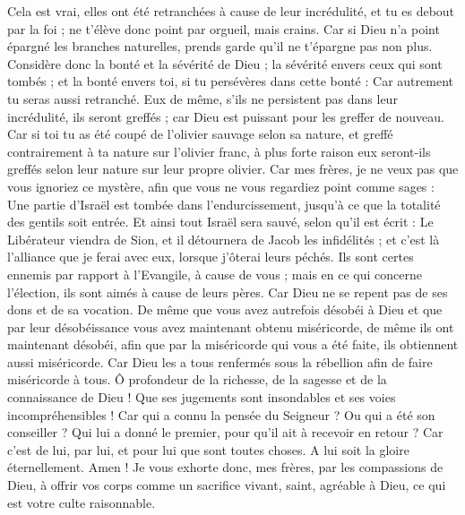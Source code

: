 \begin{multicols}{2}
Cela est vrai, elles ont été retranchées à cause de leur incrédulité, et tu es debout par la foi ; ne t'élève donc point par orgueil, mais crains.
Car si Dieu n'a point épargné les branches naturelles, prends garde qu'il ne t'épargne pas non plus.
Considère donc la bonté et la sévérité de Dieu ; la sévérité envers ceux qui sont tombés ; et la bonté envers toi, si tu persévères dans cette bonté : Car autrement tu seras aussi retranché.
Eux de même, s'ils ne persistent pas dans leur incrédulité, ils seront greffés ; car Dieu est puissant pour les greffer de nouveau.
Car si toi tu as été coupé de l'olivier sauvage selon sa nature, et greffé contrairement à ta nature sur l'olivier franc, à plus forte raison eux seront-ils greffés selon leur nature sur leur propre olivier.
Car mes frères, je ne veux pas que vous ignoriez ce mystère, afin que vous ne vous regardiez point comme sages : Une partie d’Israël est tombée dans l’endurcissement, jusqu’à ce que la totalité des gentils soit entrée.
Et ainsi tout Israël sera sauvé, selon qu’il est écrit : Le Libérateur viendra de Sion, et il détournera de Jacob les infidélités ;
et c'est là l'alliance que je ferai avec eux, lorsque j'ôterai leurs péchés.
Ils sont certes ennemis par rapport à l'Evangile, à cause de vous ; mais en ce qui concerne l’élection, ils sont aimés à cause de leurs pères.
Car Dieu ne se repent pas de ses dons et de sa vocation.
De même que vous avez autrefois désobéi à Dieu et que par leur désobéissance vous avez maintenant obtenu miséricorde,
de même ils ont maintenant désobéi, afin que par la miséricorde qui vous a été faite, ils obtiennent aussi miséricorde.
Car Dieu les a tous renfermés sous la rébellion afin de faire miséricorde à tous.
Ô profondeur de la richesse, de la sagesse et de la connaissance de Dieu ! Que ses jugements sont insondables et ses voies incompréhensibles !
Car qui a connu la pensée du Seigneur ? Ou qui a été son conseiller ?
Qui lui a donné le premier, pour qu’il ait à recevoir en retour ?
Car c’est de lui, par lui, et pour lui que sont toutes choses. A lui soit la gloire éternellement. Amen !
\VerseOne{}Je vous exhorte donc, mes frères, par les compassions de Dieu, à offrir vos corps comme un sacrifice vivant, saint, agréable à Dieu, ce qui est votre culte raisonnable.

\end{multicols}
